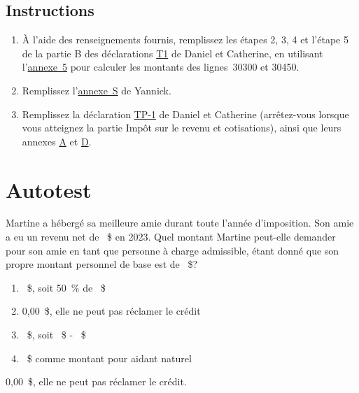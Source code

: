 \subsection{Instructions}
\begin{enumerate}
	\item À l'aide des renseignements fournis, remplissez les étapes 2, 3, 4 et l'étape 5 de la partie B des déclarations \href{https://www.canada.ca/fr/agence-revenu/services/formulaires-publications/trousses-impot-toutes-annees-imposition/trousse-generale-impot-prestations/quebec/5005-r.html}{T1} de Daniel et Catherine, en utilisant l'\href{https://www.canada.ca/fr/agence-revenu/services/formulaires-publications/trousses-impot-toutes-annees-imposition/trousse-generale-impot-prestations/5000-s5.html}{annexe~5} pour calculer les montants des lignes~30300 et 30450.
	\item Remplissez l'\href{https://www.revenuquebec.ca/documents/fr/formulaires/tp/2023-12/TP-1.D.S%282023-12%29.pdf}{annexe~S} de Yannick.
	\item Remplissez la déclaration \href{https://www.revenuquebec.ca/documents/fr/formulaires/tp/2023-12/TP-1.D%282023-12%29.pdf}{TP-1} de Daniel et Catherine (arrêtez-vous lorsque vous atteignez la partie Impôt sur le revenu et cotisations), ainsi que leurs annexes \href{https://www.revenuquebec.ca/documents/fr/formulaires/tp/2023-12/TP-1.D.A%282023-12%29.pdf}{A} et \href{https://www.revenuquebec.ca/documents/fr/formulaires/tp/2023-12/TP-1.D.D%282023-12%29.pdf}{D}.
\end{enumerate}



\section{Autotest }
\setcounter{question}{0}
\begin{question}
	Martine a hébergé sa meilleure amie durant toute l'année d'imposition. Son amie a eu un revenu net de ~\$ en 2023. Quel montant Martine peut-elle demander pour son amie en tant que personne à charge admissible, étant donné que son propre montant personnel de base est de ~\$?
	\begin{enumerate}
		\item 	{}~\$, soit 50~\% de ~\$
		\item 	0,00~\$, elle ne peut pas réclamer le crédit
		\item 	{}~\$, soit ~\$ - ~\$
		\item 	{}~\$ comme montant pour aidant naturel
	\end{enumerate}
\end{question}
0,00~\$, elle ne peut pas réclamer le crédit.

